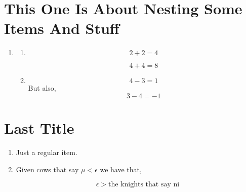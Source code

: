 \documentclass{article}
\begin{document}
\section{This One Is About Nesting Some Items And Stuff}
\begin{enumerate}[label=(\alph*)]
\item{
    \begin{enumerate}[label=(\roman*)]
    \item{
        \begin{equation*}
            2 + 2 = 4
        \end{equation*}

        \begin{equation*}
            4 + 4 = 8
        \end{equation*}
    }
    \item{
        \begin{equation*}
            4 - 3 = 1
        \end{equation*}
        But also,
        \begin{equation*}
            3 - 4 = -1
        \end{equation*}
    }
    \end{enumerate}
}
\end{enumerate}

\section{Last Title}
\begin{enumerate}[label=(\alph*)]
\item{
    Just a regular item.
}
\item{
    Given cows that say $\mu  < \epsilon$ we have that,

    \begin{equation}
        \epsilon > \text{the knights that say ni}
    \end{equation}
}
\end{enumerate}

\end{document}
